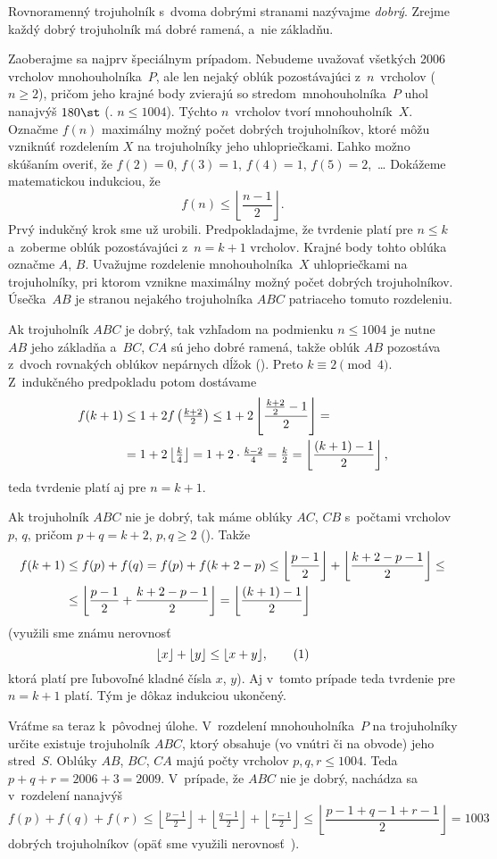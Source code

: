 {%
\def\lfl{\left\lfloor}\def\rfl{\right\rfloor}%
Rovnoramenný trojuholník s~dvoma dobrými stranami nazývajme {\it dobrý}. Zrejme každý dobrý trojuholník má dobré ramená, a~nie základňu. 

Zaoberajme sa najprv špeciálnym prípadom. Nebudeme uvažovať všetkých 2006 vrcholov mnohouholníka~$P$, ale len nejaký oblúk pozostávajúci z~$n$~vrcholov ($n\ge2$), pričom jeho krajné body zvierajú so stredom~mnohouholníka~$P$ uhol nanajvýš $180\st$ (\tj. $n\le1004$). Týchto $n$~vrcholov tvorí mnohouholník~$X$. Označme $f(n)$ maximálny možný počet dobrých trojuholníkov, ktoré môžu vzniknúť rozdelením $X$ na trojuholníky jeho uhlopriečkami. Ľahko možno skúšaním overiť, že $f(2)=0$, $f(3)=1$, $f(4)=1$, $f(5)=2$,~\dots{} Dokážeme matematickou indukciou, že
$$
f(n)\le\lfl\frac{n-1}2\rfl.
$$ 
Prvý indukčný krok sme už urobili. Predpokladajme, že tvrdenie platí pre $n\le k$ a~zoberme oblúk pozostávajúci z~$n=k+1$ vrcholov. Krajné body tohto oblúka označme $A$, $B$. Uvažujme rozdelenie mnohouholníka~$X$ uhlopriečkami na trojuholníky, pri ktorom vznikne maximálny možný počet dobrých trojuholníkov. Úsečka~$AB$ je stranou nejakého trojuholníka $ABC$ patriaceho tomuto rozdeleniu.

Ak trojuholník $ABC$ je dobrý, tak vzhľadom na podmienku $n\le1004$ je nutne $AB$ jeho základňa a~$BC$, $CA$ sú jeho dobré ramená, takže oblúk $AB$ pozostáva z~dvoch rovnakých oblúkov nepárnych dĺžok (\obr). Preto $k\equiv2\pmod4$. Z~indukčného predpokladu potom dostávame
$$
\aligned
f(k+1) &\le 1+2f\left(\tfrac{k+2}2\right) \le 1+2\lfl\frac{\frac{k+2}2-1}2\rfl =\\
&=1+2\lfl\tfrac k4\rfl=1+2\cdot\tfrac{k-2}4=\tfrac k2=\lfl\frac{(k+1)-1}2\rfl,
\endaligned
$$
teda tvrdenie platí aj pre $n=k+1$.

Ak trojuholník $ABC$ nie je dobrý, tak máme oblúky $AC$, $CB$ s~počtami vrcholov $p$, $q$, pričom $p+q=k+2$, $p,q\ge2$ (\obr). Takže
$$
\aligned
f(k+1)&\le f(p)+f(q) = f(p)+f(k+2-p) \le \lfl\frac{p-1}2\rfl+\lfl\frac{k+2-p-1}2\rfl \le\\
&\le \lfl\frac{p-1}2+\frac{k+2-p-1}2\rfl = \lfl\frac{(k+1)-1}2\rfl
\endaligned
$$  
(využili sme známu nerovnosť
$$
\lfloor x\rfloor+\lfloor y\rfloor\le\lfloor x+y\rfloor,
\tag1
$$
ktorá platí pre ľubovoľné kladné čísla $x$, $y$). Aj v~tomto prípade teda tvrdenie pre $n=k+1$ platí. Tým je dôkaz indukciou ukončený.

\smallskip
Vráťme sa teraz k~pôvodnej úlohe. V~rozdelení mnohouholníka~$P$ na trojuholníky určite existuje trojuholník $ABC$, ktorý obsahuje (vo vnútri či na obvode) jeho stred~$S$. Oblúky $AB$, $BC$, $CA$ majú počty vrcholov $p,q,r\le1004$. Teda $p+q+r=2006+3=2009$. V~prípade, že $ABC$ nie je dobrý, nachádza sa v~rozdelení nanajvýš
$$
f(p)+f(q)+f(r) \le \lfl\tfrac{p-1}2\rfl+\lfl\tfrac{q-1}2\rfl+\lfl\tfrac{r-1}2\rfl \le \lfl\frac{p-1+q-1+r-1}2\rfl=1003
$$
dobrých trojuholníkov (opäť sme využili nerovnosť~).

}
